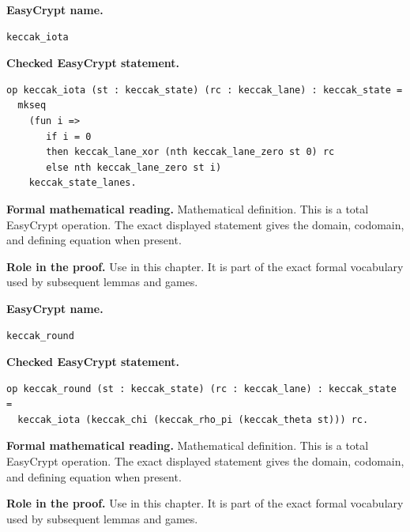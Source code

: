 \begin{formaldefinition}
\noindent\textbf{EasyCrypt name.}
\begin{lstlisting}[language=EasyCrypt,basicstyle=\ttfamily\scriptsize]
keccak_iota
\end{lstlisting}
\noindent\textbf{Checked EasyCrypt statement.}
\begin{lstlisting}[language=EasyCrypt,basicstyle=\ttfamily\scriptsize]
op keccak_iota (st : keccak_state) (rc : keccak_lane) : keccak_state =
  mkseq
    (fun i =>
       if i = 0
       then keccak_lane_xor (nth keccak_lane_zero st 0) rc
       else nth keccak_lane_zero st i)
    keccak_state_lanes.
\end{lstlisting}
\noindent\textbf{Formal mathematical reading.}
Mathematical definition. This is a total EasyCrypt operation.  The exact displayed statement gives the domain, codomain, and defining equation when present.

\noindent\textbf{Role in the proof.}
Use in this chapter. It is part of the exact formal vocabulary used by subsequent lemmas and games.

\end{formaldefinition}

\begin{formaldefinition}
\noindent\textbf{EasyCrypt name.}
\begin{lstlisting}[language=EasyCrypt,basicstyle=\ttfamily\scriptsize]
keccak_round
\end{lstlisting}
\noindent\textbf{Checked EasyCrypt statement.}
\begin{lstlisting}[language=EasyCrypt,basicstyle=\ttfamily\scriptsize]
op keccak_round (st : keccak_state) (rc : keccak_lane) : keccak_state =
  keccak_iota (keccak_chi (keccak_rho_pi (keccak_theta st))) rc.
\end{lstlisting}
\noindent\textbf{Formal mathematical reading.}
Mathematical definition. This is a total EasyCrypt operation.  The exact displayed statement gives the domain, codomain, and defining equation when present.

\noindent\textbf{Role in the proof.}
Use in this chapter. It is part of the exact formal vocabulary used by subsequent lemmas and games.

\end{formaldefinition}

